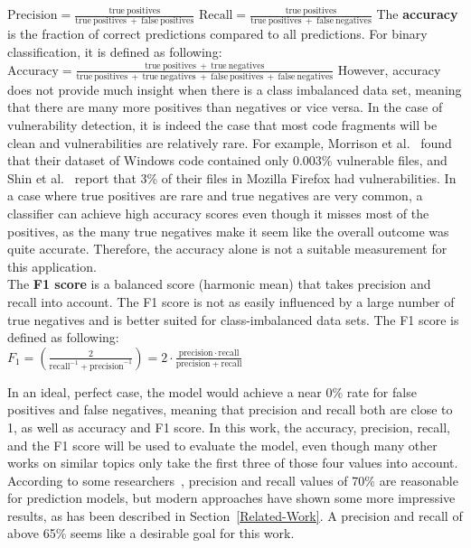 \documentclass[
a4paper,
pagesize,
pdftex,
12pt,
ngerman,
fleqn,
final,
]{scrartcl}
\begin{document}
	\mbox{}\newline
	$ \mathrm{Precision} = \frac{\mathrm{true~positives}}{\mathrm{true~positives}~+~\mathrm{false~positives}}$\newline
	\mbox{}\newline
	$\mathrm{Recall} = \frac{\mathrm{true~positives}}{\mathrm{true~positives}~+~\mathrm{false~negatives}}$\newline
	\mbox{}\newline
	The \textbf{accuracy} is the fraction of correct predictions compared to all predictions. For binary classification, it is defined as following:  \newline
	\mbox{}\newline
	$\mathrm{Accuracy} = \frac{\mathrm{true~positives}~+~\mathrm{true~negatives}}{\mathrm{true~positives}~+~\mathrm{true~negatives}~+~\mathrm{false~positives}~+~\mathrm{false~negatives}}$\newline
	\mbox{}\newline
	However, accuracy does not provide much insight when there is a class imbalanced data set, meaning that there are many more positives than negatives or vice versa. In the case of vulnerability detection, it is indeed the case that most code fragments will be clean and vulnerabilities are relatively rare. For example, Morrison et al.~\cite{Morrison.2015} found that their dataset of Windows code contained only 0.003\% vulnerable files, and Shin et al.~\cite{Shin.2010} report that 3\% of their files in Mozilla Firefox had vulnerabilities. In a case where true positives are rare and true negatives are very common, a classifier can achieve high accuracy scores even though it misses most of the positives, as the many true negatives make it seem like the overall outcome was quite accurate. Therefore, the accuracy alone is not a suitable measurement for this application.\\
	The \textbf{F1 score} is a balanced score (harmonic mean) that takes precision and recall into account. The F1 score is not as easily influenced by a large number of true negatives and is better suited for class-imbalanced data sets. The F1 score is defined as following:\\
	\mbox{}\newline
	$ F_{1}=\left({\frac {2}{\mathrm {recall} ^{-1}+\mathrm {precision} ^{-1}}}\right)=2\cdot {\frac {\mathrm {precision} \cdot \mathrm {recall} }{\mathrm {precision} +\mathrm {recall} }}$
	
	
	In an ideal, perfect case, the model would achieve a near 0\% rate for false positives and false negatives, meaning that precision and recall both are close to 1, as well as accuracy and F1 score. In this work, the accuracy, precision, recall, and the F1 score will be used to evaluate the model, even though many other works on similar topics only take the first three of those four values into account.\\
	According to some researchers~\cite{Morrison.2015,Shin.2013,Neuhaus.2007}, precision and recall values of 70\% are reasonable for prediction models, but modern approaches have shown some more impressive results, as has been described in Section~\ref{Related-Work}. A precision and recall of above 65\% seems like a desirable goal for this work.
	
\end{document}
